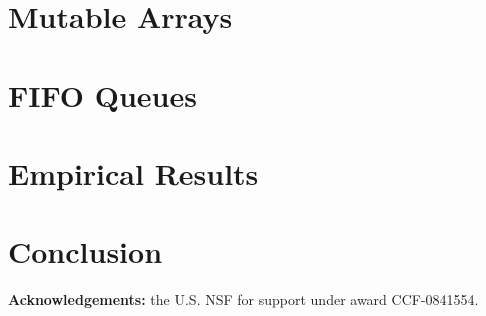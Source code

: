 \documentclass[9pt,natbib]{sigplanconf}
\begin{document}
\section{Mutable Arrays}

\section{FIFO Queues}

\section{Empirical Results}

\section{Conclusion}

\textbf{Acknowledgements:} the U.S. NSF for support under award CCF-0841554.




\end{document}
